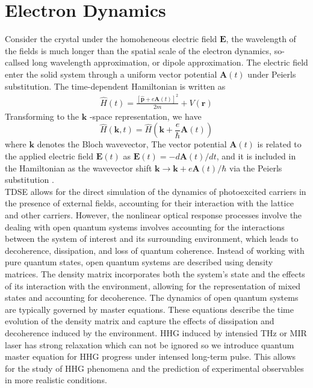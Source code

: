 \section{Electron Dynamics}
Consider the crystal under the homoheneous electric field $\mathbf {E}$, the wavelength of the fields
is much longer than the spatial scale of the electron dynamics, so-callsed long wavelength approximation, or dipole approximation. The electric field enter the solid system through a uniform
vector potential $\mathbf {A} (t)$ under Peierls substitution\cite{hofstadter1976energy}. The time-dependent Hamiltonian is written as
\begin{align}
	\hat{H}(t)=\frac{[\hat{\mathbf{p}}+e \mathbf{A}(t)]^{2}}{2 m}+V(\mathbf{r})
\end{align}
Transforming to the $\mathbf{k}$ -space representation, we have
\begin{equation}
	\hat{H}(\mathbf{k}, t)=\hat{H}\left(\mathbf{k}+\frac{e}{\hbar} \mathbf{A}(t)\right)
	\label{eqn:vTD}
\end{equation}
where $\mathbf k$ denotes the Bloch wavevector, The vector potential $\mathbf A(t)$ is related to the applied electric field $\mathbf E(t)$ as $\mathbf E(t)=-d\mathbf A(t)/dt$, and it is included in the Hamiltonian as the wavevector shift $\mathbf k \rightarrow \mathbf k + e\mathbf A(t)/\hbar$ via the Peierls substitution  \cite{hofstadter1976energy}.\\
\color{red}
\gls{TDSE} allows for the direct simulation of the dynamics of photoexcited carriers in the presence of external fields, accounting for their interaction with the lattice and other carriers.
However, the nonlinear optical response processes involve the dealing with open quantum systems involves accounting for the interactions between the system of interest and its surrounding environment, which leads to decoherence, dissipation, and loss of quantum coherence. Instead of working with pure quantum states, open quantum systems are described using density matrices. The density matrix incorporates both the system's state and the effects of its interaction with the environment, allowing for the representation of mixed states and accounting for decoherence. The dynamics of open quantum systems are typically governed by master equations. These equations describe the time evolution of the density matrix and capture the effects of dissipation and decoherence induced by the environment.
HHG induced by intensied THz or MIR laser has strong relaxation which can not be ignored so we introduce quantum master equation for HHG progress under intensed long-term pulse. This allows for the study of \gls{HHG} phenomena and the prediction of experimental observables in more realistic conditions.
\color{black}

